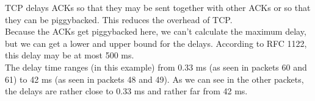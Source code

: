 TCP delays ACKs so that they may be sent together with other ACKs or so that they can be piggybacked. This reduces the overhead of TCP. \\
Because the ACKs get piggybacked here, we can't calculate the maximum delay, but we can get a lower and upper bound for the delays.
According to RFC 1122, this delay may be at most 500 ms. \\
The delay time ranges (in this example) from 0.33 ms (as seen in packets 60 and 61) to 42 ms (as seen in packets 48 and 49).
As we can see in the other packets, the delays are rather close to 0.33 ms and rather far from 42 ms.